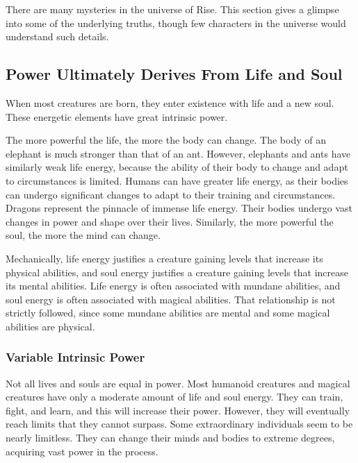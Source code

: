     There are many mysteries in the universe of Rise.
    This section gives a glimpse into some of the underlying truths, though few characters in the universe would understand such details.

    \subsection{Power Ultimately Derives From Life and Soul}
        When most creatures are born, they enter existence with life and a new soul.
        These energetic elements have great intrinsic power.

        The more powerful the life, the more the body can change.
        The body of an elephant is much stronger than that of an ant.
        However, elephants and ants have similarly weak life energy, because the ability of their body to change and adapt to circumstances is limited.
        Humans can have greater life energy, as their bodies can undergo significant changes to adapt to their training and circumstances.
        Dragons represent the pinnacle of immense life energy.
        Their bodies undergo vast changes in power and shape over their lives.
        Similarly, the more powerful the soul, the more the mind can change.

        Mechanically, life energy justifies a creature gaining levels that increase its physical abilities, and soul energy justifies a creature gaining levels that increase its mental abilities.
        Life energy is often associated with mundane abilities, and soul energy is often associated with magical abilities.
        That relationship is not strictly followed, since some mundane abilities are mental and some magical abilities are physical.

        \subsubsection{Variable Intrinsic Power}
            Not all lives and souls are equal in power.
            Most humanoid creatures and magical creatures have only a moderate amount of life and soul energy.
            They can train, fight, and learn, and this will increase their power.
            However, they will eventually reach limits that they cannot surpass.
            Some extraordinary individuals seem to be nearly limitless.
            They can change their minds and bodies to extreme degrees, acquiring vast power in the process.

